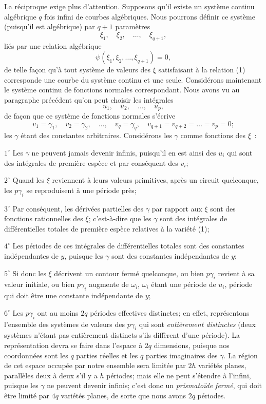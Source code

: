 \documentclass{article}
\begin{document}
La réciproque exige plus d'attention. Supposons qu'il existe un système continu algébrique $q$ fois infini de courbes algébriques. Nous pourrons définir ce système (puisqu'il est algébrique) par $q + 1$ paramètres
\[
\xi_{1}, \quad \xi_{2}, \quad \ldots, \quad \xi_{q+1},
\]
liés par une relation algébrique
\[
\psi(\xi_{1}, \xi_{2}, \ldots, \xi_{q+1}) = 0, \tag{1}
\]
de telle façon qu'à tout système de valeurs des $\xi$ satisfaisant à la relation (1) corresponde une courbe du système continu et une seule. Considérons maintenant le système continu de fonctions normales correspondant. Nous avons vu au paragraphe précédent qu'on peut choisir les intégrales
\[
u_{1}, \quad u_{2}, \quad \ldots, \quad u_{p},
\]
de façon que ce système de fonctions normales s'écrive
\[
v_{1} = \gamma_{1}, \quad v_{2} = \gamma_{2}, \quad \ldots, \quad v_{q} = \gamma_{q}, \quad v_{q+1} = v_{q+2} = \ldots = v_{p} = 0;
\]
les $\gamma$ étant des constantes arbitraires. Considérons les $\gamma$ comme fonctions des $\xi$~:

$1^\circ$ Les $\gamma$ ne peuvent jamais devenir infinis, puisqu'il en est ainsi des $u_{i}$ qui sont des intégrales de première espèce et par conséquent des $v_{i}$;

$2^\circ$ Quand les $\xi$ reviennent à leurs valeurs primitives, après un circuit quelconque, les $p\gamma_{i}$ se reproduisent à une période près;

$3^\circ$ Par conséquent, les dérivées partielles des $\gamma$ par rapport aux $\xi$ sont des fonctions rationnelles des $\xi$; c'est-à-dire que les $\gamma$ sont des intégrales de différentielles totales de première espèce relatives à la variété (1);

$4^\circ$ Les périodes de ces intégrales de différentielles totales sont des constantes indépendantes de $y$, puisque les $\gamma$ sont des constantes indépendantes de $y$;

$5^\circ$ Si donc les $\xi$ décrivent un contour fermé quelconque, ou bien $p\gamma_{i}$ revient à sa valeur initiale, ou bien $p\gamma_{i}$ augmente de $\omega_{i}$, $\omega_{i}$ étant une période de $u_{i}$, période qui doit être une constante indépendante de $y$;

$6^\circ$ Les $p\gamma_{i}$ ont au moins $2q$ périodes effectives distinctes; en effet, représentons l'ensemble des systèmes de valeurs des $p\gamma_{i}$ qui sont \emph{entièrement distinctes} (deux systèmes n'étant pas entièrement distincts s'ils diffèrent d'une période). La représentation devra se faire dans l'espace à $2q$ dimensions, puisque nos coordonnées sont les $q$ parties réelles et les $q$ parties imaginaires des $\gamma$. La région de cet espace occupée par notre ensemble sera limitée par $2h$ variétés planes, parallèles deux à deux s'il y a $h$ périodes; mais elle ne peut s'étendre à l'infini, puisque les $\gamma$ ne peuvent devenir infinis; c'est donc un \emph{prismatoïde fermé}, qui doit être limité par $4q$ variétés planes, de sorte que nous avons $2q$ périodes.
\end{document}
